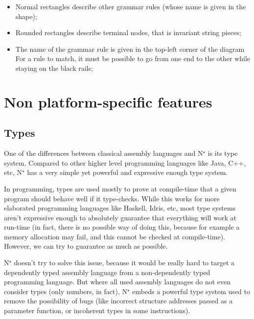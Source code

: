 \begin{itemize}
\begin{figure}[H]
{          }
        \end{figure}
        \begin{itemize}
          \item Normal rectangles describe other grammar rules (whose name is given in the shape);
          \item Rounded rectangles describe terminal nodes, that is invariant string pieces;
          \item The name of the grammar rule is given in the top-left corner of the diagram
                For a rule to match, it must be possible to go from one end to the other while staying on the black rails;
        \end{itemize}
\end{itemize}

\chapter{Non platform-specific features}\label{chap:nstar-common}

\section{Types}\label{sec:nstar-common-ts}

One of the differences between classical assembly languages and N$^\star$ is its type system.
Compared to other higher level programming languages like Java, C++, etc, N$^\star$ has a very simple yet powerful and expressive enough type system.

In programming, types are used mostly to prove at compile-time that a given program should behave well if it type-checks. While this works for more elaborated programming languages like Haskell, Idris, etc, most type systems aren't expressive enough to absolutely guarantee that everything will work at run-time (in fact, there is no possible way of doing this, because for example a memory allocation may fail, and this cannot be checked at compile-time). However, we can try to guarantee as much as possible.

N$^\star$ doesn't try to solve this issue, because it would be really hard to target a dependently typed assembly language from a non-dependently typed programming language. But where all used assembly languages do not even consider types (only numbers, in fact), N$^\star$ embeds a powerful type system used to remove the possibility of bugs (like incorrect structure addresses passed as a parameter function, or incoherent types in some instructions).

